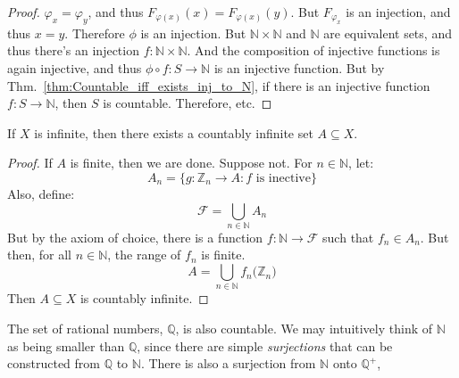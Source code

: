 \begin{proof}
            $\varphi_{x}=\varphi_{y}$, and thus
            $F_{\varphi(x)}(x)=F_{\varphi(x)}(y)$. But
            $F_{\varphi_{x}}$ is an injection, and
            thus $x=y$. Therefore $\phi$ is an injection.
            But $\mathbb{N}\times\mathbb{N}$ and $\mathbb{N}$
            are equivalent sets, and thus there's an
            injection $f:\mathbb{N}\times\mathbb{N}$. And
            the composition of injective functions is again
            injective, and thus
            $\phi\circ{f}:S\rightarrow\mathbb{N}$ is an
            injective function. But by
            Thm.~\ref{thm:Countable_iff_exists_inj_to_N},
            if there is an injective function
            $f:S\rightarrow\mathbb{N}$, then $S$ is
            countable. Therefore, etc.
        \end{proof}
        \begin{theorem}
            If $X$ is infinite, then there exists a
            countably infinite set $A\subseteq{X}$.
        \end{theorem}
        \begin{proof}
            If $A$ is finite, then we are done. Suppose not.
            For $n\in\mathbb{N}$, let:
            \begin{equation}
                A_{n}
                =\{g:\mathbb{Z}_{n}\rightarrow{A}:f\textrm{ is inective}\}
            \end{equation}
            Also, define:
            \begin{equation}
                \mathcal{F}=\bigcup_{n\in\mathbb{N}}A_{n}
            \end{equation}
            But by the axiom of choice, there is a function
            $f:\mathbb{N}\rightarrow\mathcal{F}$ such that
            $f_{n}\in{A}_{n}$. But then, for all
            $n\in\mathbb{N}$, the range of $f_{n}$ is finite.
            \begin{equation}
                A=\bigcup_{n\in\mathbb{N}}f_{n}
                    \Big(\mathbb{Z}_{n}\Big)
            \end{equation}
            Then $A\subseteq{X}$ is countably infinite.
        \end{proof}
        The set of rational numbers, $\mathbb{Q}$, is also
        countable. We may intuitively think of $\mathbb{N}$
        as being smaller than $\mathbb{Q}$, since there are
        simple \textit{surjections} that can be constructed
        from $\mathbb{Q}$ to $\mathbb{N}$. There is also a
        surjection from $\mathbb{N}$ onto $\mathbb{Q}^{+}$,
